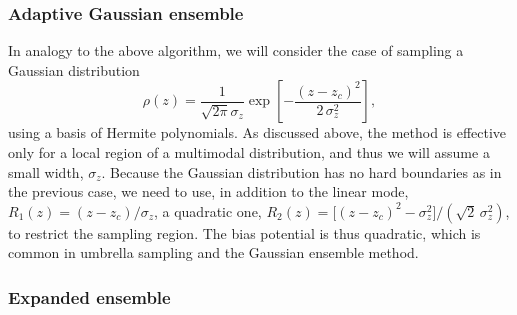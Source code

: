 \documentclass[preprint, superscriptaddress, floatfix]{revtex4-1}
\begin{document}
\subsubsection{\label{sec:age}
Adaptive Gaussian ensemble}

In analogy to the above algorithm,
we will consider the case of sampling
a Gaussian distribution
\begin{equation}
  \rho(z)
  =
  \frac{1}{\sqrt{2\pi} \sigma_z}
  \exp\left[ - \frac{(z-z_c)^2}{2\,\sigma_z^2} \right]
  ,
  \label{eq:rho_Gaussian}
\end{equation}
using a basis of Hermite polynomials\cite{arfken}.
%
As discussed above,
the method is effective only for
a local region of a multimodal distribution,
and thus we will assume a small width, $\sigma_z$.
%
Because the Gaussian distribution has no hard boundaries
as in the previous case,
we need to use,
in addition to the linear mode,
$R_1(z) = (z - z_c)/\sigma_z$,
a quadratic one,
$R_2(z) = \bigl[(z - z_c)^2 - \sigma_z^2\bigr] /\left(\sqrt 2 \, \sigma_z^2\right)$,
to restrict the sampling region.
%
The bias potential is thus quadratic,
which is common in umbrella sampling\cite{maragliano2006, *abrams2008, zhu2012}
and the Gaussian ensemble method\cite{hetherington1987,
*challa1988, *costeniuc2006, neuhaus2006, *neuhaus2007}.



\subsubsection{\label{sec:st}
Expanded ensemble}
\end{document}
